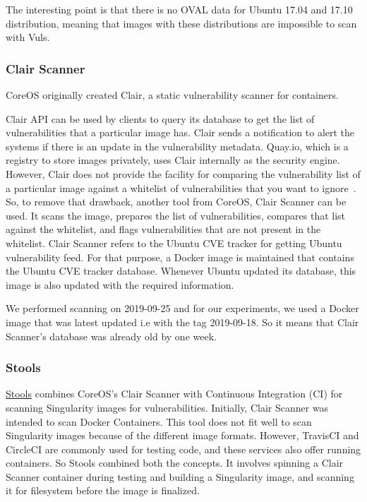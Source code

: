 \documentclass[a4paper,num-refs]{oup-contemporary}
\begin{document}
The interesting point is that there is no OVAL data for Ubuntu 17.04 and 17.10 distribution,
meaning that images with these distributions are impossible to scan with Vuls.



\subsubsection{Clair Scanner}

CoreOS originally created Clair, a static vulnerability scanner for containers. 

Clair API can be used by clients to query its database to get
the list of vulnerabilities that a particular image has. Clair sends a notification
to alert the systems if there is an update in the vulnerability metadata. Quay.io, which
is a registry to store images privately, uses Clair internally as the security engine. However, Clair does not 
provide the facility for comparing
the vulnerability list of a particular image against a whitelist of vulnerabilities that you
want to ignore~\cite{arminc_2019}. 
So, to remove
that drawback, another tool from CoreOS, Clair Scanner can be used. It scans the image, prepares the list of
vulnerabilities, compares that list against the whitelist, and flags vulnerabilities
that are not present in the whitelist.
Clair Scanner refers to the Ubuntu CVE tracker for getting Ubuntu vulnerability feed.
For that purpose, a Docker image is maintained that contains the Ubuntu CVE tracker database.
Whenever Ubuntu updated its database, this image is also updated with the required information.

We performed scanning on 2019-09-25 and for our experiments, we used a Docker image that was 
latest updated i.e with the tag 2019-09-18. So it means that Clair Scanner's database was already
old by one week.


\subsubsection{Stools}

\href{https://github.com/singularityhub/stools}{Stools} combines CoreOS's Clair Scanner with Continuous Integration (CI)
for scanning Singularity images for vulnerabilities.
Initially, Clair Scanner was intended to scan Docker Containers. This tool does not fit well
to scan Singularity images because of the different image formats.
However, TravisCI and CircleCI are commonly used for testing code, and these
services also offer running containers. So Stools combined both the concepts.
It involves spinning a Clair Scanner container during testing and building a
Singularity image, and scanning it for filesystem before the image is finalized.
\end{document}
